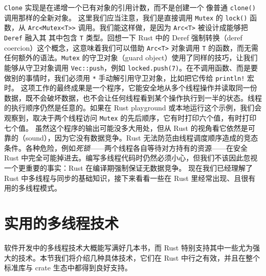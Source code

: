 \texttt{Clone} 实现是在递增一个已有对象的引用计数，而不是创建一个
像普通 \texttt{clone()} 调用那样的全新对象。
这里我们应当注意，我们是直接调用 \texttt{Mutex} 的 \texttt{lock()} 函数，从
\texttt{Arc<\allowbreak{}Mutex<\allowbreak{}T>\allowbreak{}>\allowbreak{}} 调用。我们能这样做，是因为 \texttt{Arc<T>} 被设计成能够把 \texttt{Deref} 融入其
其中包含 \texttt{T} 类型。回想一下 Rust 中的 Deref 强制转换（deref coercion）这个概念，这意味着我们可以借助 \texttt{Arc<T>} 对象调用 \texttt{T} 的函数，而无需任何额外的语法。\texttt{Mutex} 的守卫对象（guard object）使用了同样的技巧，让我们能够从守卫对象调用 \texttt{Vec::push}，例如 \texttt{locked.\allowbreak{}push(\allowbreak{}7)\allowbreak{}}。在不调用函数、而是要做别的事情时，我们必须用 \texttt{*} 手动解引用守卫对象，比如把它传给 \texttt{println!} 宏时。
\label{idx:idx_997cade8}
\label{idx:idx_d53931f2}
这项工作的最终成果是一个程序，它能安全地从多个线程操作并读取同一份数据，既不会破坏数据，也不会让任何线程看到某个操作执行到一半的状态。线程的执行顺序仍然是任意的。如果在 Rust playground 或本地运行这个示例，我们会观察到，取决于两个线程访问 \texttt{Mutex} 的先后顺序，它有时打印六个值，有时打印七个值。
虽然这个程序的输出可能没多大用处，但从 Rust 的视角看它依然是可靠的（sound），因为它没有数据竞争。Rust 无法防范由线程调度顺序造成的竞态条件。各种危险，例如\emph{死锁}——两个线程各自等待对方持有的资源——在安全 Rust 中完全可能掉进去。编写多线程代码时仍然必须小心，但我们不该因此忽视一个更重要的事实：Rust 在编译期强制保证无数据竞争。
现在我们已经理解了 Rust 中多线程与同步的基础知识，接下来看看一些在 Rust 里经常出现、且很有用的多线程模式。
\section{实用的多线程技术}
\label{idx:idx_2504dca4}
软件开发中的多线程技术大概能写满好几本书，而 Rust 特别支持其中一些尤为强大的技术。本节我们将介绍几种具体技术，它们在 Rust 中行之有效，并且在整个标准库与 crate 生态中都得到良好支持。
